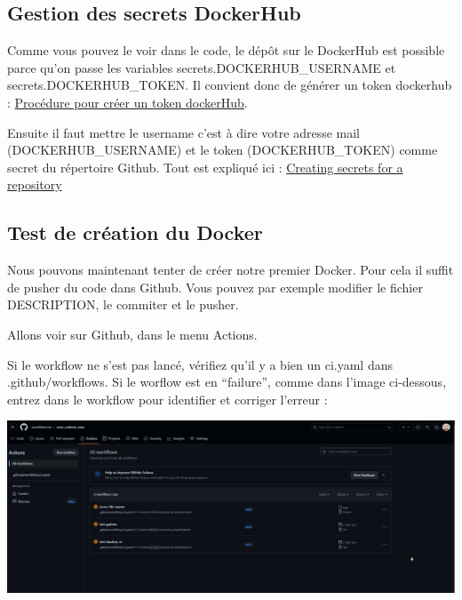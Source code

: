 \documentclass[
  letterpaper,
  DIV=11,
  numbers=noendperiod]{scrreprt}
\begin{document}
\hypertarget{gestion-des-secrets-dockerhub}{%
\subsection{Gestion des secrets
DockerHub}\label{gestion-des-secrets-dockerhub}}

Comme vous pouvez le voir dans le code, le dépôt sur le DockerHub est
possible parce qu'on passe les variables secrets.DOCKERHUB\_USERNAME et
secrets.DOCKERHUB\_TOKEN. Il convient donc de générer un token dockerhub
:
\href{https://docs.docker.com/security/for-developers/access-tokens/\#create-an-access-token}{Procédure
pour créer un token dockerHub}.

Ensuite il faut mettre le username c'est à dire votre adresse mail
(DOCKERHUB\_USERNAME) et le token (DOCKERHUB\_TOKEN) comme secret du
répertoire Github. Tout est expliqué ici :
\href{https://docs.github.com/en/actions/security-guides/using-secrets-in-github-actions\#creating-secrets-for-a-repository}{Creating
secrets for a repository}

\hypertarget{test-de-cruxe9ation-du-docker}{%
\subsection{Test de création du
Docker}\label{test-de-cruxe9ation-du-docker}}

Nous pouvons maintenant tenter de créer notre premier Docker. Pour cela
il suffit de pusher du code dans Github. Vous pouvez par exemple
modifier le fichier DESCRIPTION, le commiter et le pusher.

Allons voir sur Github, dans le menu Actions.

Si le workflow ne s'est pas lancé, vérifiez qu'il y a bien un ci.yaml
dans .github/workflows. Si le worflow est en ``failure'', comme dans
l'image ci-dessous, entrez dans le workflow pour identifier et corriger
l'erreur :

\includegraphics{./images/github_actions_error.png}
\end{document}

